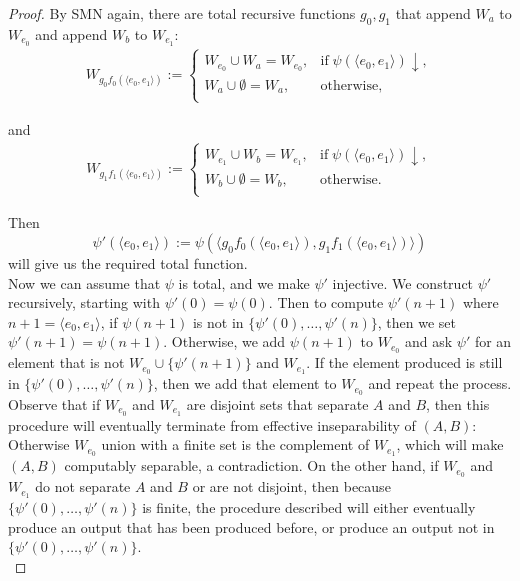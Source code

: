 \documentclass{article}
\begin{document}
\begin{enumerate}[label={\bf Q\arabic*:}]
\begin{enumerate}[label={(\roman*)}]
\begin{proof}
          By SMN again, there are total recursive functions $g_0,g_1$ that
          append $W_a$ to $W_{e_0}$ and append $W_b$ to $W_{e_1}$:
          \begin{align*}
            W_{g_0f_0(\langle e_0,e_1\rangle)} :=
            \begin{cases}
              W_{e_0}\cup W_a=W_{e_0}, &\text{if}\; \psi(\langle
                e_0,e_1\rangle)\downarrow,\\
              W_a\cup\emptyset =W_a, &\text{otherwise},\\
            \end{cases}
          \end{align*}

          and
          \begin{align*}
            W_{g_1f_1(\langle e_0,e_1\rangle)} :=
            \begin{cases}
              W_{e_1}\cup W_b=W_{e_1}, &\text{if}\; \psi(\langle
                e_0,e_1\rangle)\downarrow,\\
              W_b\cup\emptyset =W_b, &\text{otherwise}.\\
            \end{cases}
          \end{align*}

          Then
          \[\psi'(\langle e_0,e_1\rangle) :=\psi(\langle g_0f_0(\langle
            e_0,e_1\rangle), g_1f_1(\langle e_0,e_1\rangle)\rangle)\]
          will give us the required total function. \\

          Now we can assume that $\psi$ is total, and we make $\psi'$
          injective. We construct $\psi'$ recursively, starting with
          $\psi'(0)=\psi(0)$. Then to compute $\psi'(n+1)$ where
          $n+1=\langle e_0,e_1\rangle$, if $\psi(n+1)$ is not in
          $\{\psi'(0),\ldots,\psi'(n)\}$, then we set
          $\psi'(n+1)=\psi(n+1)$. Otherwise, we add $\psi(n+1)$ to
          $W_{e_0}$ and ask $\psi'$ for an element that is not
          $W_{e_0}\cup\{\psi'(n+1)\}$ and $W_{e_1}$. If the element
          produced is still in $\{\psi'(0),\ldots,\psi'(n)\}$, then we add
          that element to $W_{e_0}$ and repeat the process. \\

          Observe that if $W_{e_0}$ and $W_{e_1}$ are disjoint sets that
          separate $A$ and $B$, then this procedure will eventually
          terminate from effective inseparability of $(A,B)$: Otherwise
          $W_{e_0}$ union with a finite set is the complement of $W_{e_1}$,
          which will make $(A,B)$ computably separable, a contradiction. On
          the other hand, if $W_{e_0}$ and $W_{e_1}$ do not separate $A$
          and $B$ or are not disjoint, then because
          $\{\psi'(0),\ldots,\psi'(n)\}$ is finite, the procedure described
          will either eventually produce an output that has been produced
          before, or produce an output not in
          $\{\psi'(0),\ldots,\psi'(n)\}$. \\


\end{proof}
\end{enumerate}
\end{enumerate}
\end{document}
